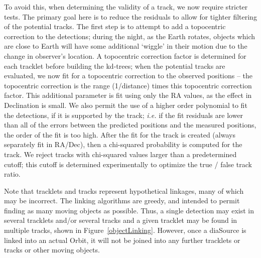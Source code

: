 To avoid this, when determining the validity of a track, we now
require stricter tests.  The primary goal here is to reduce the
residuals to allow for tighter filtering of the potential tracks. The
first step is to attempt to add a topocentric correction to the
detections; during the night, as the Earth rotates, objects which are
close to Earth will have some additional `wiggle' in their motion due
to the change in observer's location.  A topocentric correction factor is
determined for each tracklet before building the kd-trees; when the potential
tracks are evaluated, we now fit for a topocentric correction to the observed 
positions -- the topocentric correction is the range (1/distance) times this topocentric 
correction factor. This additional parameter is fit using only the RA values,
as the effect in Declination is small. We also permit the use of a higher 
order polynomial to fit the detections, if it is supported by the track;
{\it i.e.} if the fit residuals are lower than all of the errors between the
predicted positions and the measured positions, the order
of the fit is too high. After the fit for the track is
created (always separately fit in RA/Dec), then a
chi-squared probability is computed for the track. We reject tracks
with chi-squared values larger than a predetermined cutoff; this
cutoff is determined experimentally to optimize the true / false track
ratio. 

Note that tracklets and tracks represent hypothetical linkages, many
of which may be incorrect.  The linking algorithms are greedy, and
intended to permit finding as many moving objects as possible. Thus, a
single detection may exist in several tracklets and/or several tracks
and a given tracklet may be found in multiple tracks, shown in
Figure~\ref{objectLinking}.  However, once a diaSource is linked into
an actual Orbit, it will not be joined into any further tracklets or
tracks or other moving objects. 


